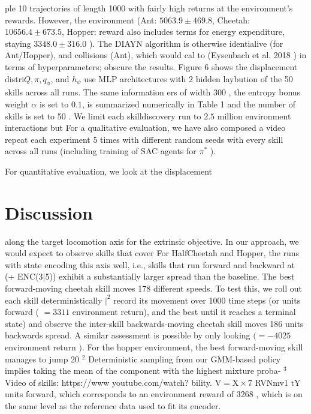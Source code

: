 ple 10 trajectories of length 1000 with fairly high returns at the environment's rewards. However, the environment (Ant: $5063.9 \pm 469.8$, Cheetah: $10656.4 \pm 673.5$, Hopper: reward also includes terms for energy expenditure, staying $3348.0 \pm 316.0$ ). The DIAYN algorithm is otherwise identialive (for Ant/Hopper), and collisions (Ant), which would cal to (Eysenbach et al. 2018 ) in terms of hyperparameters; obscure the results. Figure 6 shows the displacement distri$Q, \pi, q_{\phi}$, and $h_{\psi}$ use MLP architectures with 2 hidden laybution of the 50 skills across all runs. The same information ers of width 300 , the entropy bonus weight $\alpha$ is set to $0.1$, is summarized numerically in Table 1 and the number of skills is set to 50 . We limit each skilldiscovery run to $2.5$ million environment interactions but For a qualitative evaluation, we have also composed a video repeat each experiment 5 times with different random seeds with every skill across all runs (including training of SAC agents for $\pi^{*}$ ).

For quantitative evaluation, we look at the displacement

\section{Discussion} along the target locomotion axis for the extrinsic objective. In our approach, we would expect to observe skills that cover For HalfCheetah and Hopper, the runs with state encoding this axis well, i.e., skills that run forward and backward at (+ ENC(3|5)) exhibit a substantially larger spread than the baseline. The best forward-moving cheetah skill moves 178 different speeds. To test this, we roll out each skill deterministically $\left.\right|^{2}$ record its movement over 1000 time steps (or units forward ( $=3311$ environment return), and the best until it reaches a terminal state) and observe the inter-skill backwards-moving cheetah skill moves 186 units backwards spread. A similar assessment is possible by only looking $(=-4025$ environment return $)$. For the hopper environment, the best forward-moving skill manages to jump 20 ${ }^{2}$ Deterministic sampling from our GMM-based policy implies taking the mean of the component with the highest mixture proba- ${ }^{3}$ Video of skills: https://www youtube.com/watch? bility. $\mathrm{V}=\mathrm{X \times} 7$ RVNmv1 $\mathrm{tY}$ units forward, which corresponds to an environment reward of 3268 , which is on the same level as the reference data used to fit its encoder.

